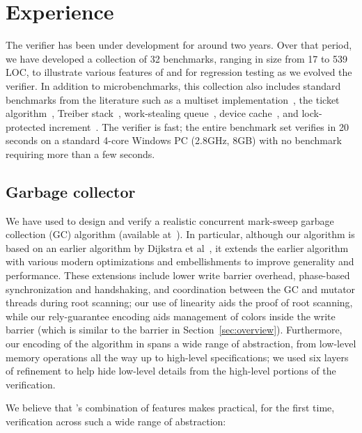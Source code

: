 \section{Experience}
\label{sec:experience}

The \civl verifier has been under development for around two years.  
Over that period, we have developed a collection of 32 benchmarks, 
ranging in size from 17 to 539 LOC, to illustrate various features of
\civl and for regression testing as we evolved the verifier.
In addition to microbenchmarks, this collection also includes
standard benchmarks from the literature such as a multiset implementation~\cite{ElmasTQ05}, 
the ticket algorithm~\cite{FarzanKP14}, 
Treiber stack~\cite{Herlihy2008}, work-stealing queue~\cite{Blumofe1999},
device cache~\cite{ElmasQT09}, and lock-protected increment~\cite{FlanaganQ03}. 
The \civl verifier is fast; the entire benchmark set verifies in 20 seconds on a standard 4-core Windows PC (2.8GHz, 8GB)
with no benchmark requiring more than a few seconds.

\subsection{Garbage collector}
We have used \civl to design and verify a realistic concurrent mark-sweep garbage collection (GC) algorithm (available at~\cite{GC}).  
In particular, although our algorithm is based on an earlier algorithm by Dijkstra et al~\cite{dijk78}, 
it extends the earlier algorithm with various modern optimizations and embellishments to improve generality and performance.  
These extensions include lower write barrier overhead, phase-based synchronization and handshaking, 
and coordination between the GC and mutator threads during root scanning; our use of linearity aids the proof of root scanning, 
while our rely-guarantee encoding aids management of colors inside the write barrier
(which is similar to the barrier in Section~\ref{sec:overview}).
Furthermore, our encoding of the algorithm in \civl spans a wide range of abstraction, 
from low-level memory operations all the way up to high-level specifications; 
we used six layers of refinement to help hide low-level details from the high-level portions of the verification.

We believe that \civl's combination of features makes practical, for the first time, verification across such a wide range of abstraction:

